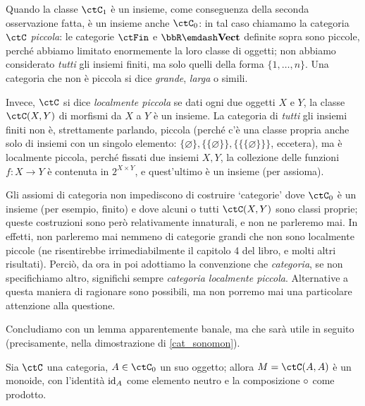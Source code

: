 \begin{definition}
	Quando la classe \(\ctC_1\) è un insieme, come conseguenza della seconda osservazione fatta, è un insieme anche \(\ctC_0\): in tal caso chiamamo la categoria \(\ctC\) \emph{piccola}: le categorie \(\ctFin\) e \(\bbR\emdash\ctVect\) definite sopra sono piccole, perché abbiamo limitato enormemente la loro classe di oggetti; non abbiamo considerato \emph{tutti} gli insiemi finiti, ma solo quelli della forma \(\{1,\dots,n\}\). Una categoria che non è piccola si dice \emph{grande}, \emph{larga} o simili.

	Invece, \(\ctC\) si dice \emph{localmente piccola} se dati ogni due oggetti \(X\) e \(Y\), la classe \(\Hom{\ctC}(X,Y)\) di morfismi da \(X\) a \(Y\) è un insieme. La categoria di \emph{tutti} gli insiemi finiti non è, strettamente parlando, piccola (perché c'è una classe propria anche solo di insiemi con un singolo elemento: \(\{\varnothing\},\{\{\varnothing\}\}, \{\{\{\varnothing\}\}\}\), eccetera), ma è localmente piccola, perché fissati due insiemi \(X,Y\), la collezione delle funzioni \(f : X\to Y\) è contenuta in \(2^{X\times Y}\), e quest'ultimo è un insieme (per assioma).
\end{definition}
\begin{remark}
	Gli assiomi di categoria non impediscono di costruire `categorie' dove \(\ctC_0\) è un insieme (per esempio, finito) e dove alcuni o tutti \(\Hom{\ctC}(X,Y)\) sono classi proprie; queste costruzioni sono però relativamente innaturali, e non ne parleremo mai. In effetti, non parleremo mai nemmeno di categorie grandi che non sono localmente piccole (ne risentirebbe irrimediabilmente il capitolo 4 del libro, e molti altri risultati). Perciò, da ora in poi adottiamo la convenzione che \emph{categoria}, se non specifichiamo altro, significhi sempre \emph{categoria localmente piccola}. Alternative a questa maniera di ragionare sono possibili, ma non porremo mai una particolare attenzione alla questione.
\end{remark}
Concludiamo con un lemma apparentemente banale, ma che sarà utile in seguito (precisamente, nella dimostrazione di \ref{cat_sonomon}).
\begin{lemma}\label{lem_end_monoide}
	Sia \(\ctC\) una categoria, \(A\in\ctC_0\) un suo oggetto; allora \(M=\Hom{\ctC}(A,A)\) è un monoide, con l'identità \(\mathrm{id}_A\) come elemento neutro e la composizione \(\circ\) come prodotto.
\end{lemma}

